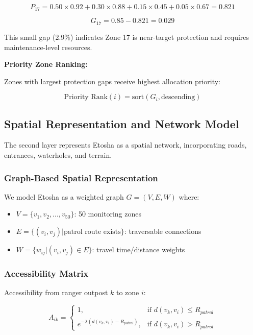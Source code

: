 \begin{equation}
P_{17} = 0.50 \times 0.92 + 0.30 \times 0.88 + 0.15 \times 0.45 + 0.05 \times 0.67 = 0.821
\end{equation}

\begin{equation}
G_{17} = 0.85 - 0.821 = 0.029
\end{equation}

This small gap (2.9\%) indicates Zone 17 is near-target protection and requires maintenance-level resources.

\textbf{Priority Zone Ranking:}

Zones with largest protection gaps receive highest allocation priority:

\begin{equation}
\text{Priority Rank}(i) = \text{sort}(G_i, \text{descending})
\label{eq:priority_rank}
\end{equation}

\subsection{Spatial Representation and Network Model}

The second layer represents Etosha as a spatial network, incorporating roads, entrances, waterholes, and terrain.

\subsubsection{Graph-Based Spatial Representation}

We model Etosha as a weighted graph $G = (V, E, W)$ where:
\begin{itemize}
\item $V = \{v_1, v_2, ..., v_{50}\}$: 50 monitoring zones
\item $E = \{(v_i, v_j) | \text{patrol route exists}\}$: traversable connections
\item $W = \{w_{ij} | (v_i, v_j) \in E\}$: travel time/distance weights
\end{itemize}

\subsubsection{Accessibility Matrix}

Accessibility from ranger outpost $k$ to zone $i$:

\begin{equation}
A_{ik} = \begin{cases}
1, & \text{if } d(v_k, v_i) \leq R_{patrol} \\
e^{-\lambda(d(v_k, v_i) - R_{patrol})}, & \text{if } d(v_k, v_i) > R_{patrol}
\end{cases}
\label{eq:accessibility}
\end{equation}

